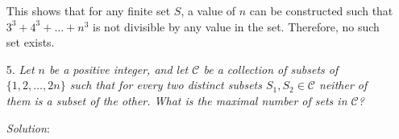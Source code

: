 \documentclass{article}
\begin{document}
\begin{enumerate}
This shows that for any finite set $S$, a value of $n$ can be constructed such that $3^3 + 4^3 + \dots + n^3$ is not divisible by any value in the set.
Therefore, no such set exists.


\item[5.] %
\textit{\newcommand{\CC}{\mathcal{C}}
Let $n$ be a positive integer, and let $\CC$ be a collection of subsets of $\{1, 2, \dotsc, 2n\}$ such that for every two distinct subsets $S_1, S_2 \in \CC$ neither of them is a subset of the other.
What is the maximal number of sets in $\CC$?}

\textit{Solution}:


\end{enumerate}
\end{document}
